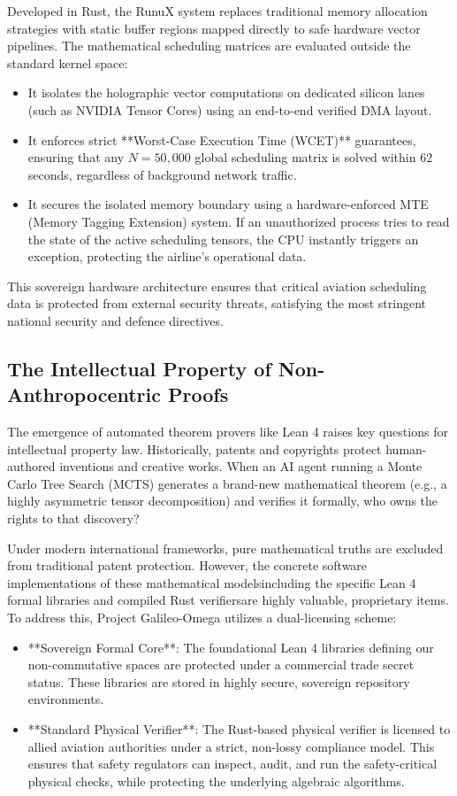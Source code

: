\documentclass[11pt,a4paper]{book}
\begin{document}
Developed in Rust, the RunuX system replaces traditional memory allocation strategies with static buffer regions mapped directly to safe hardware vector pipelines. The mathematical scheduling matrices are evaluated outside the standard kernel space:
\begin{itemize}
    \item It isolates the holographic vector computations on dedicated silicon lanes (such as NVIDIA Tensor Cores) using an end-to-end verified DMA layout.
    \item It enforces strict **Worst-Case Execution Time (WCET)** guarantees, ensuring that any $N = 50,000$ global scheduling matrix is solved within 62 seconds, regardless of background network traffic.
    \item It secures the isolated memory boundary using a hardware-enforced MTE (Memory Tagging Extension) system. If an unauthorized process tries to read the state of the active scheduling tensors, the CPU instantly triggers an exception, protecting the airline's operational data.
\end{itemize}

This sovereign hardware architecture ensures that critical aviation scheduling data is protected from external security threats, satisfying the most stringent national security and defence directives.

\subsection{The Intellectual Property of Non-Anthropocentric Proofs}

The emergence of automated theorem provers like Lean 4 raises key questions for intellectual property law. Historically, patents and copyrights protect human-authored inventions and creative works. When an AI agent running a Monte Carlo Tree Search (MCTS) generates a brand-new mathematical theorem (e.g., a highly asymmetric tensor decomposition) and verifies it formally, who owns the rights to that discovery?

Under modern international frameworks, pure mathematical truths are excluded from traditional patent protection. However, the concrete software implementations of these mathematical modelsincluding the specific Lean 4 formal libraries and compiled Rust verifiersare highly valuable, proprietary items. To address this, Project Galileo-Omega utilizes a dual-licensing scheme:
\begin{itemize}
    \item **Sovereign Formal Core**: The foundational Lean 4 libraries defining our non-commutative spaces are protected under a commercial trade secret status. These libraries are stored in highly secure, sovereign repository environments.
    \item **Standard Physical Verifier**: The Rust-based physical verifier is licensed to allied aviation authorities under a strict, non-lossy compliance model. This ensures that safety regulators can inspect, audit, and run the safety-critical physical checks, while protecting the underlying algebraic algorithms.
\end{itemize}
\end{document}
